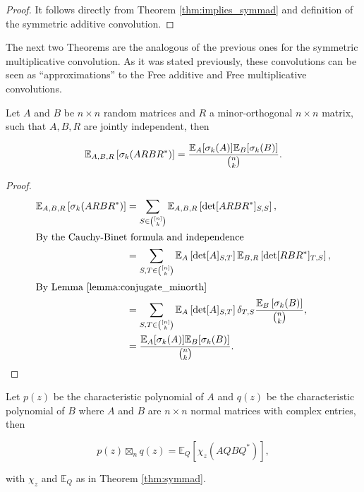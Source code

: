 \begin{proof}
    It follows directly from Theorem \ref{thm:implies_symmad} and definition of the symmetric additive convolution.
\end{proof}


The next two Theorems are the analogous of the previous ones for the symmetric multiplicative convolution. As it was stated previously, these convolutions can be seen as ``approximations'' to the Free additive and Free multiplicative convolutions.


\begin{theorem} \label{thm:implies_symm_mult}
    Let $A$ and $B$ be $n\times n$ random matrices and $R$ a minor-orthogonal $n\times n$ matrix, such that $A,B,R$ are jointly independent, then

    \begin{equation*}
        \mathbb E_{A,B,R} \left[\sigma_k(ARBR^*)\right] = \frac{\mathbb E_A[\sigma_k(A)]\mathbb E_B[\sigma_k(B)]}{\binom{n}{k}}.
    \end{equation*}
\end{theorem}

\begin{proof}
    \begin{align*}
        \mathbb E_{A,B,R} \left[\sigma_k(ARBR^*)\right] &= \sum_{S \in \binom{[n]}{k}} \mathbb E_{A,B,R} \left[\det[ARBR^*]_{S,S}\right],\\ 
        \intertext{By the Cauchy-Binet formula and independence}
        &= \sum_{S,T \in \binom{[n]}{k}} \mathbb E_A\left[ \det[A]_{S,T} \right] \mathbb E_{B,R} \left[ \det [RBR^*]_{T,S} \right],\\ 
        \intertext{By Lemma \ref{lemma:conjugate_minorth}}
        &= \sum_{S,T \in \binom{[n]}{k}} \mathbb E_A\left[\det[A]_{S,T} \right] \delta_{T,S}\frac{\mathbb E_B\left[ \sigma_k(B)\right]}{\binom{n}{k}},\\
        &= \frac{\mathbb E_A[\sigma_k(A)]\mathbb E_B[\sigma_k(B)]}{\binom{n}{k}}.
    \end{align*}
\end{proof}


\begin{theorem}
    Let $p(z)$ be the characteristic polynomial of $A$ and $q(z)$ be the characteristic polynomial of $B$ where $A$ and $B$ are $n\times n$ normal matrices with complex entries, then 

    \begin{equation*}
        p(z) \boxtimes_n q(z) = \mathbb E_Q \left[ \chi_z (AQBQ^*) \right],
    \end{equation*}

    \noindent with $\chi_z$ and $\mathbb E_Q$ as in Theorem \ref{thm:symmad}.
\end{theorem}

